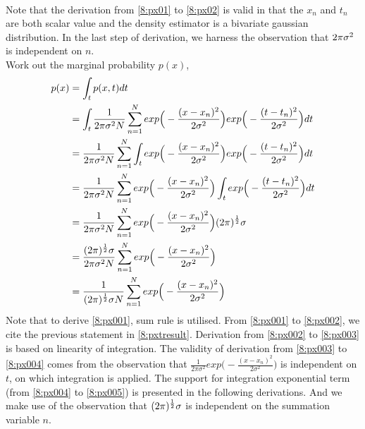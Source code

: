 \documentclass[11pt,a4paper]{article}
\newcommand{\htab}{\hspace*{0.63cm}}
\begin{document}
{\begin{align}
    \end{align}
\htab Note that the derivation from \eqref{8:px01} to \eqref{8:px02} is valid in that the $x_{n}$ and
    $t_{n}$ are both scalar value and the density estimator is a bivariate gaussian distribution. In the
    last step of derivation, we harness the observation that $2\pi \sigma^{2}$ is independent on $n$. \\
\htab Work out the marginal probability $p(x)$, 
    \begin{align}
        p(x) 
        &= \int_{t} p(x,t) d t \label{8:px001} \\
        &= \int_{t} \frac{1}{2\pi \sigma^{2} N} \sum_{n=1}^{N}  
        exp \Big( - \frac{(x-x_{n})^{2}} {2\sigma^{2}} \Big)
        exp \Big( -  \frac{(t-t_{n})^{2}}{2\sigma^{2}} \Big) d t \label{8:px002} \\
        &=   \frac{1}{2\pi \sigma^{2} N} \sum_{n=1}^{N} \int_{t}  
        exp \Big( - \frac{(x-x_{n})^{2}} {2\sigma^{2}} \Big)
        exp \Big( -  \frac{(t-t_{n})^{2}}{2\sigma^{2}} \Big) d t \label{8:px003} \\
        &=  \frac{1}{2\pi \sigma^{2} N} \sum_{n=1}^{N}   
        exp \Big( - \frac{(x-x_{n})^{2}} {2\sigma^{2}} \Big) \int_{t}
        exp \Big( -  \frac{(t-t_{n})^{2}}{2\sigma^{2}} \Big) d t \label{8:px004}  \\
        &=  \frac{1}{2\pi \sigma^{2} N} \sum_{n=1}^{N}   
        exp \Big( - \frac{(x-x_{n})^{2}} {2\sigma^{2}} \Big) (2\pi)^{\frac{1}{2}} \sigma  \label{8:px005}  \\
        &= \frac{(2\pi)^{\frac{1}{2}} \sigma}{2\pi \sigma^{2} N}  \sum_{n=1}^{N}   
        exp \Big( - \frac{(x-x_{n})^{2}} {2\sigma^{2}} \Big) \label{8:px006}\\
        &=   \frac{1}{(2\pi)^{\frac{1}{2}} \sigma N} \sum_{n=1}^{N}  
        exp \Big( - \frac{(x-x_{n})^{2}} {2\sigma^{2}} \Big)
        \label{8:px}
        \end{align}
\htab Note that to derive \eqref{8:px001}, sum rule is utilised. From \eqref{8:px001} to \eqref{8:px002},
we cite the previous statement in \eqref{8:pxtresult}. Derivation from \eqref{8:px002} to \eqref{8:px003}
is based on linearity of integration. The validity of derivation from \eqref{8:px003} to \eqref{8:px004}
comes from the observation that $\frac{1}{2\pi \sigma^{2}} exp \Big( - \frac{(x-x_{n})^{2}} {2\sigma^{2}} \Big)$
is independent on $t$, on which integration is applied. The support for integration exponential term  
(from \eqref{8:px004} to \eqref{8:px005}) is presented in the following derivations. And we make use of
the observation that $(2\pi)^{\frac{1}{2}} \sigma$ is independent on the summation variable $n$. \\
}
\end{document}
